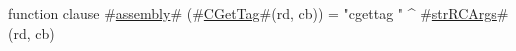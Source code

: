 function clause #\hyperref[sailMIPSzassembly]{assembly}# (#\hyperref[sailMIPSzCGetTag]{CGetTag}#(rd, cb)) = "cgettag " ^ #\hyperref[sailMIPSzstrRCArgs]{strRCArgs}#(rd, cb)
